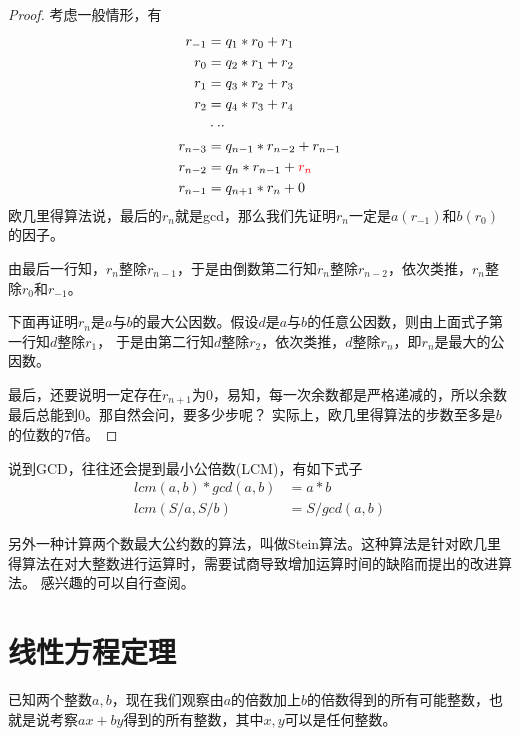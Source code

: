 \begin{proof}
	考虑一般情形，有
	\begin{align*}
	r_{-1} &= q_1*r_0 + r_1 \\
	r_0 &= q_2*r_1 + r_2 \\
	r_1 &= q_3 * r_2 + r_3 \\
	r_2 &= q_4 * r_3 + r_4 \\
 	&\cdot \cdot \cdot\\
	r_{n-3} &= q_{n-1}*r_{n-2} + r_{n-1} \\
	r_{n-2} &= q_{n} * r_{n-1} + {\color{red} r_n} \\
	r_{n-1} &= q_{n+1} * r_n + 0 \\
	\end{align*}
	欧几里得算法说，最后的$r_n$就是gcd，那么我们先证明$r_n$一定是$a(r_{-1})$和$b(r_0)$的因子。
	
	由最后一行知，$r_n$整除$r_{n-1}$，于是由倒数第二行知$r_n$整除$r_{n-2}$，依次类推，$r_n$整除$r_{0}$和$r_{-1}$。
	
	下面再证明$r_n$是$a$与$b$的{\heiti 最大}公因数。假设$d$是$a$与$b$的任意公因数，则由上面式子第一行知$d$整除$r_1$，
	于是由第二行知$d$整除$r_2$，依次类推，$d$整除$r_n$，即$r_n$是最大的公因数。
	
	最后，还要说明一定存在$r_{n+1}$为0，易知，每一次余数都是严格递减的，所以余数最后总能到0。那自然会问，要多少步呢？
	实际上，{\heiti 欧几里得算法的步数至多是$b$的位数的7倍}。
\end{proof}




说到GCD，往往还会提到最小公倍数(LCM)，有如下式子
\begin{align*}
lcm(a,b) * gcd(a,b) &=a*b \\
lcm(S/a, S/b) &= S/gcd(a, b)
\end{align*}

\begin{note}
另外一种计算两个数最大公约数的算法，叫做{\heiti Stein算法}。这种算法是针对欧几里得算法在对大整数进行运算时，需要试商导致增加运算时间的缺陷而提出的改进算法。
感兴趣的可以自行查阅。
\end{note}


\section{线性方程定理}

已知两个整数$a,b$，现在我们观察由$a$的倍数加上$b$的倍数得到的所有可能整数，也就是说{\heiti 考察$ax+by$得到的所有整数}，其中$x,y$可以是任何整数。

